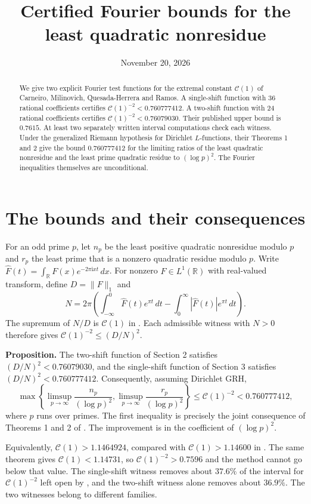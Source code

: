 \documentclass[11pt]{article}
\title{Certified Fourier bounds for the least quadratic nonresidue}
\author{\paperAuthor}
\date{November 20, 2026}
\newcommand{\CC}{\mathcal C(1)}
\newcommand{\RR}{\mathbb R}
\newcommand{\ii}{\mathrm i}
\begin{document}
\maketitle
\begin{abstract}
We give two explicit Fourier test functions for the extremal constant
$\mathcal C(1)$ of Carneiro, Milinovich, Quesada-Herrera and Ramos. A
single-shift function with 36 rational coefficients certifies
$\mathcal C(1)^{-2}<0.760777412$. A two-shift function with 24 rational
coefficients certifies $\mathcal C(1)^{-2}<0.76079030$. Their published
upper bound is $0.7615$. At least two separately written interval
computations check each witness. Under the generalized Riemann
hypothesis for Dirichlet $L$-functions, their Theorems 1 and 2 give the
bound $0.760777412$ for the limiting ratios of the least quadratic
nonresidue and the least prime quadratic residue to $(\log p)^2$.
The Fourier inequalities themselves are unconditional.
\end{abstract}

\section{The bounds and their consequences}
For an odd prime $p$, let $n_p$ be the least positive quadratic nonresidue
modulo $p$ and $r_p$ the least prime that is a nonzero quadratic residue
modulo $p$. Write $\widehat F(t)=\int_{\RR} F(x)e^{-2\pi\ii xt}\,dx$. For
nonzero $F\in L^1(\RR)$ with real-valued transform, define $D=\|F\|_1$ and
\[
 N=2\pi\left(\int_{-\infty}^0 \widehat F(t)e^{\pi t}\,dt
                 -\int_0^\infty |\widehat F(t)|e^{\pi t}\,dt\right).
\]
The supremum of $N/D$ is $\CC$ in \cite[(1.1)]{cmqr}. Each admissible
witness with $N>0$ therefore gives $\CC^{-2}\le(D/N)^2$.

\medskip\noindent
\textbf{Proposition.} The two-shift function of Section 2 satisfies
$(D/N)^2<0.76079030$, and the single-shift function of Section 3
satisfies $(D/N)^2<0.760777412$. Consequently, assuming Dirichlet GRH,
\[
 \max\!\left\{\limsup_{p\to\infty}\frac{n_p}{(\log p)^2},
               \limsup_{p\to\infty}\frac{r_p}{(\log p)^2}\right\}
 \le \CC^{-2}<0.760777412 ,
\]
where $p$ runs over primes. The first inequality is precisely the joint
consequence of Theorems 1 and 2 of \cite{cmqr}. The improvement is in the
coefficient of $(\log p)^2$.

Equivalently, $\CC>1.1464924$, compared with $\CC>1.14600$ in
\cite[Theorem 5]{cmqr}. The same theorem gives $\CC<1.14731$, so
$\CC^{-2}>0.7596$ and the method cannot go below that value. The
single-shift witness removes about $37.6\%$ of the interval for $\CC^{-2}$
left open by \cite[Theorem 5]{cmqr}, and the two-shift witness alone
removes about $36.9\%$. The two witnesses belong to different families.
\end{document}
